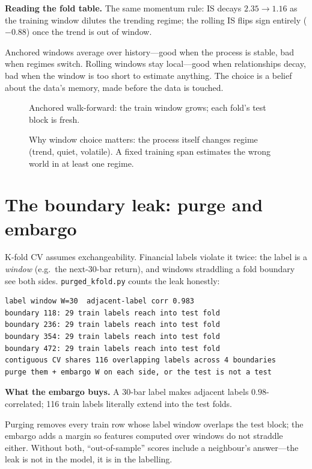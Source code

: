\begin{example}\label{ex:wf}
\textbf{Reading the fold table.} The same momentum rule: IS decays $2.35\to1.16$ as the
training window dilutes the trending regime; the rolling IS flips sign entirely
($-0.88$) once the trend is out of window.
\begin{solution}
Anchored windows average over history---good when the process is stable, bad when regimes
switch. Rolling windows stay local---good when relationships decay, bad when the window
is too short to estimate anything. The choice is a belief about the data's memory, made
before the data is touched.
\end{solution}
\end{example}

\begin{figure}[htbp]\centering

\caption{Anchored walk-forward: the train window grows; each fold's test block is fresh.}
\label{fig:wf}
\end{figure}

\begin{figure}[htbp]\centering

\caption{Why window choice matters: the process itself changes regime (trend, quiet,
volatile). A fixed training span estimates the wrong world in at least one regime.}
\label{fig:regime}
\end{figure}

\section{The boundary leak: purge and embargo}\label{sec:purge}

K-fold CV assumes exchangeability. Financial labels violate it twice: the label is a
\emph{window} (e.g.\ the next-30-bar return), and windows straddling a fold boundary see
both sides. \texttt{purged\_kfold.py} counts the leak honestly:
\begin{lstlisting}[numbers=none]
label window W=30  adjacent-label corr 0.983
boundary 118: 29 train labels reach into test fold
boundary 236: 29 train labels reach into test fold
boundary 354: 29 train labels reach into test fold
boundary 472: 29 train labels reach into test fold
contiguous CV shares 116 overlapping labels across 4 boundaries
purge them + embargo W on each side, or the test is not a test
\end{lstlisting}

\begin{example}\label{ex:purge}
\textbf{What the embargo buys.} A 30-bar label makes adjacent labels $0.98$-correlated;
116 train labels literally extend into the test folds.
\begin{solution}
Purging removes every train row whose label window overlaps the test block; the embargo
adds a margin so features computed over windows do not straddle either. Without both,
``out-of-sample'' scores include a neighbour's answer---the leak is not in the model,
it is in the labelling.
\end{solution}
\end{example}

